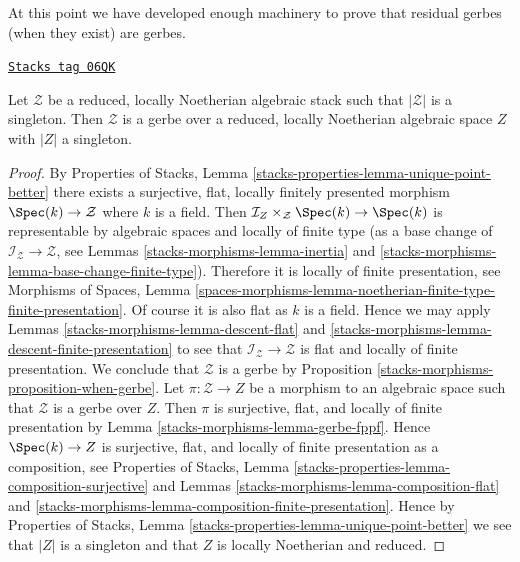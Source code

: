 At this point we have developed enough machinery to prove that residual
gerbes (when they exist) are gerbes.

\begin{lemma}
\label{stacks-morphisms-lemma-noetherian-singleton-stack-gerbe}
\href{https://stacks.math.columbia.edu/tag/06QK}{\texttt{Stacks tag 06QK}}

Let $\mathcal{Z}$ be a reduced, locally Noetherian algebraic stack
such that $|\mathcal{Z}|$ is a singleton. Then $\mathcal{Z}$ is a gerbe
over a reduced, locally Noetherian algebraic space $Z$ with $|Z|$ a
singleton.
\end{lemma}

\begin{proof}
By
Properties of Stacks, Lemma \ref{stacks-properties-lemma-unique-point-better}
there exists a surjective, flat, locally finitely presented morphism
$\Spec(k) \to \mathcal{Z}$ where $k$ is a field.
Then $\mathcal{I}_Z \times_\mathcal{Z} \Spec(k) \to \Spec(k)$
is representable by algebraic spaces and
locally of finite type (as a base change of
$\mathcal{I}_\mathcal{Z} \to \mathcal{Z}$, see
Lemmas \ref{stacks-morphisms-lemma-inertia} and \ref{stacks-morphisms-lemma-base-change-finite-type}).
Therefore it is locally of finite presentation, see
Morphisms of Spaces, Lemma
\ref{spaces-morphisms-lemma-noetherian-finite-type-finite-presentation}.
Of course it is also flat as $k$ is a field. Hence we may apply
Lemmas \ref{stacks-morphisms-lemma-descent-flat} and
\ref{stacks-morphisms-lemma-descent-finite-presentation}
to see that $\mathcal{I}_\mathcal{Z} \to \mathcal{Z}$ is flat and
locally of finite presentation. We conclude that $\mathcal{Z}$
is a gerbe by
Proposition \ref{stacks-morphisms-proposition-when-gerbe}.
Let $\pi : \mathcal{Z} \to Z$ be a morphism to an algebraic space such
that $\mathcal{Z}$ is a gerbe over $Z$. Then $\pi$ is surjective, flat, and
locally of finite presentation by
Lemma \ref{stacks-morphisms-lemma-gerbe-fppf}.
Hence $\Spec(k) \to Z$ is surjective, flat, and locally of finite
presentation as a composition, see
Properties of Stacks,
Lemma \ref{stacks-properties-lemma-composition-surjective}
and
Lemmas \ref{stacks-morphisms-lemma-composition-flat} and
\ref{stacks-morphisms-lemma-composition-finite-presentation}.
Hence by
Properties of Stacks, Lemma \ref{stacks-properties-lemma-unique-point-better}
we see that $|Z|$ is a singleton and that $Z$ is locally Noetherian
and reduced.
\end{proof}

